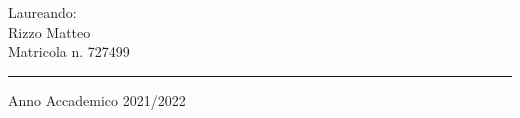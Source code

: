 \begin{titlepage}
    \begin{flushright}
    {\fontsize{17}{17}\selectfont
    Laureando:\\
    Rizzo Matteo\\
    Matricola n. 727499\\
    }

    \end{flushright}


    \vspace*{5mm}

    \rule{0.8\textwidth}{0.4pt}
    \begin{center}
    {\fontsize{17}{17}\selectfont
    Anno Accademico 2021/2022
    }
    \end{center}


\end{titlepage}
\restoregeometry
